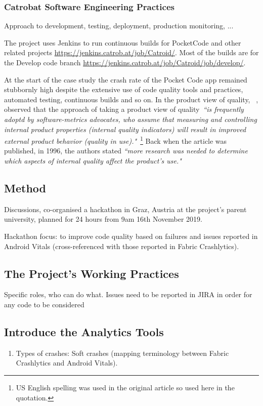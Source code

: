 \subsubsection{Catrobat Software Engineering Practices}
Approach to development, testing, deployment, production monitoring, ...

The project uses Jenkins to run continuous builds for PocketCode and other related projects \url{https://jenkins.catrob.at/job/Catroid/}. Most of the builds are for the Develop code branch \url{https://jenkins.catrob.at/job/Catroid/job/develop/}.

At the start of the case study the crash rate of the Pocket Code app remained stubbornly high despite the extensive use of code quality tools and practices, automated testing, continuous builds and so on. In the product view of quality, ~\citep{kitchenham1996_software_quality_elusive_target}, observed that the approach of taking a product view of quality~\emph{``is frequently adoptd by software-metrics advocates, who assume that measuring and controlling internal product properties (internal quality indicators) will result in improved external product behavior (quality in use)."}~\footnote{US English spelling was used in the original article so used here in the quotation.} Back when the article was published, in 1996, the authors stated \emph{``more research was needed to determine which aspects of internal quality affect the product's use."}

\subsection{Method}
Discussions, co-organised a hackathon in Graz, Austria at the project's parent university, planned for 24 hours from 9am 16th November 2019. 

Hackathon focus: to improve code quality based on failures and issues reported in Android Vitals (cross-referenced with those reported in Fabric Crashlytics).

\subsection{The Project's Working Practices}
Specific roles, who can do what.
Issues need to be reported in JIRA in order for any code to be considered

\subsection{Introduce the Analytics Tools}
\begin{enumerate}
    \item Types of crashes: Soft crashes (mapping terminology between Fabric Crashlytics and Android Vitals).
\end{enumerate}

